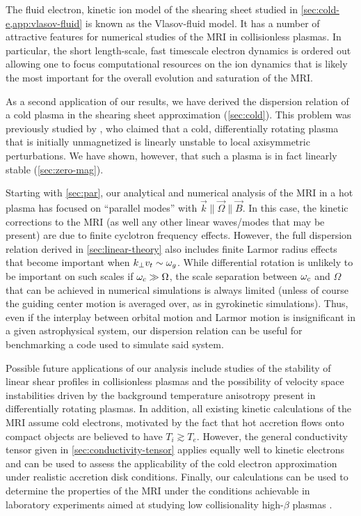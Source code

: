 \documentclass[aps,pre,notitlepage,amsmath,amssymb,amsfonts,nobibnotes,nofootinbib]{revtex4-1}
\begin{document}
The fluid electron, kinetic ion model of the shearing sheet studied in
\cref{sec:cold-e,app:vlasov-fluid} is known as the Vlasov-fluid model. It has
a number of attractive features for numerical studies of the MRI in
collisionless plasmas. In particular, the short length-scale, fast timescale
electron dynamics is ordered out allowing one to focus computational resources
on the ion dynamics that is likely the most important for the overall
evolution and saturation of the MRI\@.

As a second application of our results, we have derived the dispersion
relation of a cold plasma in the shearing sheet approximation
(\cref{sec:cold}). This problem was previously studied by \citet{Krolik2006},
who claimed that a cold, differentially rotating plasma that is initially
unmagnetized is linearly unstable to local axisymmetric perturbations. We have
shown, however, that such a plasma is in fact linearly stable
(\cref{sec:zero-mag}).

Starting with \cref{sec:par}, our analytical and numerical analysis of the MRI
in a hot plasma has focused on ``parallel modes'' with
$\vec{k}\parallel\vec{\Omega}\parallel\vec{B}$. In this case, the kinetic
corrections to the MRI (as well any other linear waves/modes that may be
present) are due to finite cyclotron frequency effects. However, the full
dispersion relation derived in \cref{sec:linear-theory} also includes finite
Larmor radius effects that become important when $k_\perp v_t\sim\omega_g$. While
differential rotation is unlikely to be important on such scales if
$\omega_c\gg\Omega$, the scale separation between $\omega_c$ and $\Omega$ that can be
achieved in numerical simulations is always limited (unless of course the
guiding center motion is averaged over, as in gyrokinetic simulations). Thus,
even if the interplay between orbital motion and Larmor motion is
insignificant in a given astrophysical system, our dispersion relation can be
useful for benchmarking a code used to simulate said system.

Possible future applications of our analysis include studies of the stability
of linear shear profiles in collisionless plasmas and the possibility of
velocity space instabilities driven by the background temperature anisotropy
present in differentially rotating plasmas.  In addition, all existing kinetic
calculations of the MRI assume cold electrons, motivated by the fact that hot
accretion flows onto compact objects are believed to have $T_i\gtrsim{}T_e$.
However, the general conductivity tensor given in
\cref{sec:conductivity-tensor} applies equally well to kinetic electrons and
can be used to assess the applicability of the cold electron approximation
under realistic accretion disk conditions.  Finally, our calculations can be
used to determine the properties of the MRI under the conditions achievable in
laboratory experiments aimed at studying low collisionality high-$\beta$
plasmas \citep[e.g.][]{Collins2012}.
\end{document}
